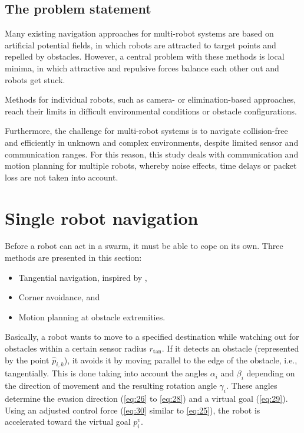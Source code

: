 \documentclass[conference]{IEEEtran}
\begin{document}
\subsection*{The problem statement}
Many existing navigation approaches for multi-robot systems are based on artificial 
potential fields, in which robots are attracted to target points and repelled by obstacles. However, a central problem with these methods is local minima, in which 
attractive and repulsive forces balance each other out and robots get stuck. 

Methods for individual robots, such as camera- or elimination-based approaches, reach their limits in 
difficult environmental conditions or obstacle configurations.

Furthermore, the challenge for multi-robot systems is to navigate collision-free and 
efficiently in unknown and complex environments, despite limited 
sensor and communication ranges. 
For this reason, this study deals with communication and motion planning 
for multiple robots,
whereby noise effects, time delays or packet loss are not taken into account.


\section{Single robot navigation}
\label{sec:Single robot navigation}
Before a robot can act in a swarm, it must be able to cope on its own. Three methods are presented in this section:
\begin{itemize}
    \item Tangential navigation, inspired by \cite{Brandao.2013},
    \item Corner avoidance, and
    \item Motion planning at obstacle extremities.
\end{itemize}

Basically, a robot wants to move to a specified destination while watching out for obstacles within a certain sensor radius \(r_{\mathrm{tan}}\). If it detects an obstacle (represented by the point \( \hat{p}_{i,k} \)), it avoids it by moving parallel to the edge of the obstacle, i.e., tangentially.
This is done taking into account the angles \( \alpha_i \) and \( \beta_i \) depending on the direction of movement and the resulting rotation angle \( \gamma_i \). 
These angles determine the evasion direction 
(\eqref{eq:26} to \eqref{eq:28}) and a virtual goal 
(\eqref{eq:29}). Using an adjusted control force 
(\eqref{eq:30} similar to \eqref{eq:25}),
 the robot is accelerated toward the virtual goal $p_i^v$.
\end{document}
